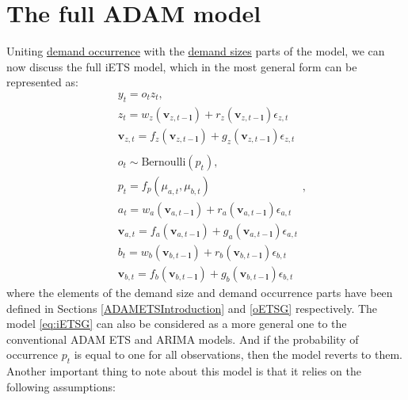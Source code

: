 \documentclass[
]{book}
\theoremstyle{definition}
\theoremstyle{definition}
\theoremstyle{definition}
\theoremstyle{definition}
\theoremstyle{remark}
\begin{document}
\hypertarget{ADAMIntermittentFull}{%
\section{The full ADAM model}\label{ADAMIntermittentFull}}

Uniting \protect\hyperlink{ADAMOccurrence}{demand occurrence} with the \protect\hyperlink{iADAMDemandSizes}{demand sizes} parts of the model, we can now discuss the full iETS model, which in the most general form can be represented as:
\begin{equation}
    \begin{aligned}
        & y_t = o_t z_t , \\
        & {z}_{t} = w_z(\mathbf{v}_{z,t-\boldsymbol{l}}) + r_z(\mathbf{v}_{z,t-\boldsymbol{l}}) \epsilon_{z,t} \\
        & \mathbf{v}_{z,t} = f_z(\mathbf{v}_{z,t-\boldsymbol{l}}) + g_z(\mathbf{v}_{z,t-\boldsymbol{l}}) \epsilon_{z,t} \\
        & \\
        & o_t \sim \text{Bernoulli} \left(p_t \right) , \\
        & p_t = f_p(\mu_{a,t}, \mu_{b,t}) \\
        & a_t = w_a(\mathbf{v}_{a,t-\boldsymbol{l}}) + r_a(\mathbf{v}_{a,t-\boldsymbol{l}}) \epsilon_{a,t} \\
        & \mathbf{v}_{a,t} = f_a(\mathbf{v}_{a,t-\boldsymbol{l}}) + g_a(\mathbf{v}_{a,t-\boldsymbol{l}}) \epsilon_{a,t} \\
        & b_t = w_b(\mathbf{v}_{b,t-\boldsymbol{l}}) + r_b(\mathbf{v}_{b,t-\boldsymbol{l}}) \epsilon_{b,t} \\
        & \mathbf{v}_{b,t} = f_b(\mathbf{v}_{b,t-\boldsymbol{l}}) + g_b(\mathbf{v}_{b,t-\boldsymbol{l}}) \epsilon_{b,t}
    \end{aligned} ,
  \label{eq:iETSG}
\end{equation}
where the elements of the demand size and demand occurrence parts have been defined in Sections \ref{ADAMETSIntroduction} and \ref{oETSG} respectively. The model \eqref{eq:iETSG} can also be considered as a more general one to the conventional ADAM ETS and ARIMA models. And if the probability of occurrence \(p_t\) is equal to one for all observations, then the model reverts to them. Another important thing to note about this model is that it relies on the following assumptions:
\end{document}
